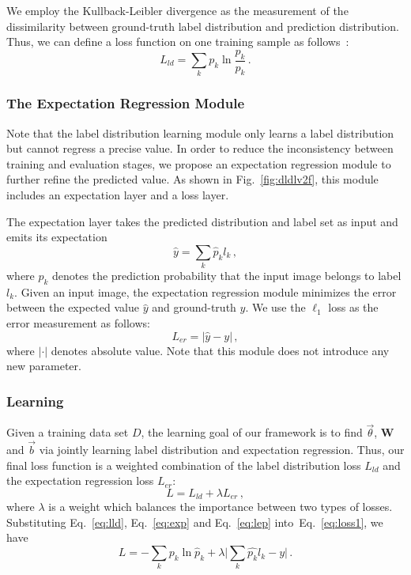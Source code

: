 \documentclass[5p,times,twocolumn]{elsarticle}
\begin{document}
We employ the Kullback-Leibler divergence as the measurement of the dissimilarity between ground-truth label distribution and prediction distribution. Thus, we can define a loss function on one training sample as follows~\cite{gao2017deep}:
\begin{equation}\label{eq:lld}
L_{ld} = \sum_k {p_k \ln \frac{p_k}{\hat {p_k}}}\,.
\end{equation}

\subsubsection{The Expectation Regression Module}
Note that the label distribution learning module only learns a label distribution but cannot regress a precise value. In order to reduce the inconsistency between training and evaluation stages, we propose an expectation regression module to further refine the predicted value. As shown in Fig.~\ref{fig:dldlv2f}, this module includes an expectation layer and a loss layer.

The expectation layer takes the predicted distribution and label set as input and emits its expectation 
\begin{equation}\label{eq:exp}
\hat y = \sum_k \hat p_k l_k \,,
\end{equation}
where $\hat p_k$ denotes the prediction probability that the input image belongs to label $l_k$.
Given an input image, the expectation regression module minimizes the error between the expected value $\hat y$ and ground-truth $y$. We use the $\ell_1$ loss as the error measurement as follows:
\begin{equation}\label{eq:lep}
L_{er} = |\hat y - y|\,,
\end{equation}
where $|\cdot|$ denotes absolute value. Note that this module does not introduce any new parameter.

\subsubsection{Learning}
Given a training data set $D$, the learning goal of our framework is to find $\vec \theta$, $\mathbf W$ and $\vec b$ via jointly learning label distribution and expectation regression. Thus, our final loss function is a weighted combination of the label distribution loss $L_{ld}$ and the expectation regression loss $L_{er}$:
\begin{equation}\label{eq:loss1}
L = L_{ld} + \lambda L_{er}\,,
\end{equation}
where $\lambda$ is a weight which balances the importance between two types of losses.
Substituting Eq.~\eqref{eq:lld}, Eq.~\eqref{eq:exp} and Eq.~\eqref{eq:lep} into~Eq.~\eqref{eq:loss1}, we have
\begin{equation}\label{eq:loss2}
L = -\sum_k p_k\ln {\hat p_k} + \lambda \Big|\sum_k{\hat {p_k}l_k}-y\Big| \,.
\end{equation}
\end{document}
